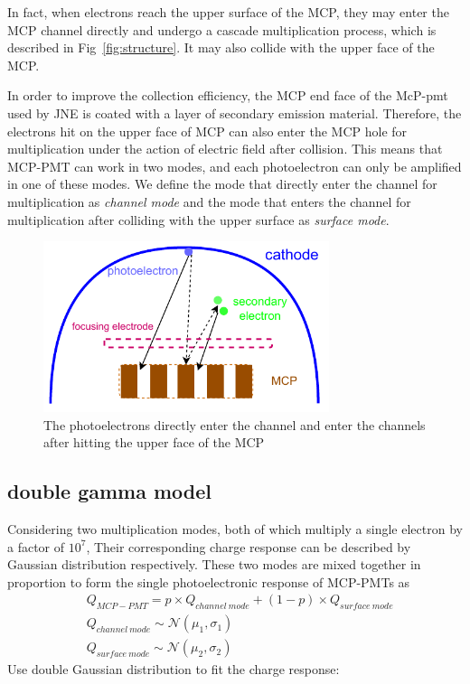 \documentclass{article}
\begin{document}
In fact, when electrons reach the upper surface of the MCP, 
they may enter the MCP channel directly and undergo a cascade multiplication process, 
which is described in Fig~\ref{fig:structure}. 
It may also collide with the upper face of the MCP.\@

In order to improve the collection efficiency, 
the MCP end face of the McP-pmt used by JNE is coated with a layer of secondary emission material.
Therefore, the electrons hit on the upper face of MCP can also enter the MCP hole for multiplication 
under the action of electric field after collision. This means that MCP-PMT can work in two modes, 
and each photoelectron can only be amplified in one of these modes. We define the mode that directly enter  the channel for multiplication as \textit{channel mode} and   
the mode that enters the channel for multiplication after colliding with the upper surface as \textit{surface mode}.
\begin{figure}[ht]
    \centering
    \includegraphics[height=5cm]{pic/MCPelectron.pdf}
    \caption{The photoelectrons directly enter the channel and enter the channels after hitting the upper face of the MCP}\label{fig:MCP}
\end{figure}
\subsection{double gamma model}\label{subsec:doublegamma}
Considering two multiplication modes, both of which multiply a single electron by a factor of $10^7$, 
Their corresponding charge response can be described by Gaussian distribution respectively. 
These two modes are mixed together in proportion to form the single photoelectronic response of MCP-PMTs as 
\begin{equation}
    \label{eq:doublegaus}
    \begin{aligned}
        & Q_{MCP-PMT} = p\times Q_{channel\  mode} + (1-p)\times Q_{surface\  mode} \\
        & Q_{channel\  mode} \sim \mathcal{N} (\mu_1, \sigma_1) \\
        & Q_{surface\  mode} \sim \mathcal{N} (\mu_2, \sigma_2)
    \end{aligned}
\end{equation}
Use double Gaussian distribution to fit the charge response:
\end{document}
